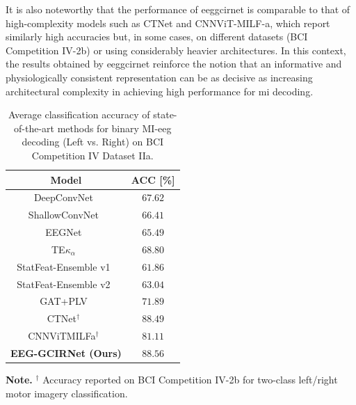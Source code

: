 It is also noteworthy that the performance of \gls{eeggcirnet} is comparable to that of high-complexity models such as CTNet and CNNViT-MILF-a, which report similarly high accuracies but, in some cases, on different datasets (BCI Competition IV-2b) or using considerably heavier architectures. In this context, the results obtained by \gls{eeggcirnet} reinforce the notion that an informative and physiologically consistent representation can be as decisive as increasing architectural complexity in achieving high performance for \gls{mi} decoding.

\begin{table}[H]
    \centering
    \caption{Average classification accuracy of state-of-the-art methods for binary MI-\gls{eeg} decoding (Left vs. Right) on BCI Competition IV Dataset IIa.}
    \label{tab:acc_comparison}
    \begin{tabularx}{\textwidth}{CC}
        \toprule
        \textbf{Model} & \textbf{ACC [\%]} \\
        \midrule
        DeepConvNet~\cite{schirrmeister2017deep} 
        & $67.62$ \\
        
        ShallowConvNet~\cite{schirrmeister2017deep} 
        & $66.41$ \\
        
        EEGNet~\cite{lawhern2018eegnet} 
        & $65.49$ \\
        
        TE$\kappa_\alpha$~\cite{de2019data} 
        & $68.80$ \\
        
        StatFeat-Ensemble v1~\cite{Degirmenci2023} 
        & $61.86$ \\
        
        StatFeat-Ensemble v2~\cite{Degirmenci2024} 
        & $63.04$ \\
        
        GAT+PLV~\cite{patel2025advancing} 
        & $71.89$ \\
        
        CTNet$^{\dagger}$~\cite{CTNet} 
        & $88.49$ \\
        
        CNNViT\text{-}MILF\text{-}a$^{\dagger}$~\cite{CNNViT} 
        & $81.11$ \\
        
        \textbf{EEG-GCIRNet (Ours)} 
        & $\mathbf{88.56}$ \\
        \bottomrule
    \end{tabularx}

    \vspace{4pt}
    \footnotesize{\textbf{Note.} $^{\dagger}$ Accuracy reported on BCI Competition IV-2b for two-class left/right motor imagery classification.}
\end{table}

